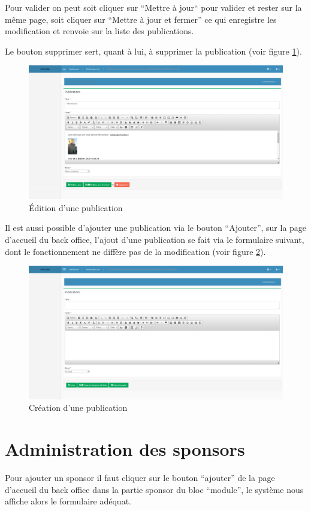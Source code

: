 \documentclass[a4paper,12pt, notitlepage]{report}
\begin{document}
Pour valider on peut soit cliquer sur “Mettre à  jour“ pour valider et rester sur la même page, soit cliquer sur  “Mettre à jour et fermer” ce qui enregistre les modification et renvoie sur la liste des publications. 

Le bouton supprimer sert, quant à lui, à supprimer la publication (voir figure \ref{modif-publication}).
\begin{figure} 
    \caption{Édition d'une publication}  
    \label{modif-publication}
    \centering
    \includegraphics[scale=0.3]{images/modif-publication.png}
\end{figure}
Il est aussi possible d’ajouter une publication via le bouton “Ajouter”, sur la page d’accueil du back office, l’ajout d’une publication se fait via le formulaire suivant, dont le fonctionnement ne diffère pas de la modification (voir figure \ref{ajout-publication}).
\begin{figure} 
    \caption{Création d'une publication}  
    \label{ajout-publication}
    \centering
    \includegraphics[scale=0.3]{images/ajout-publication.png}
\end{figure}

\chapter{Administration des sponsors}
Pour ajouter un sponsor il faut cliquer sur le bouton “ajouter” de la page d’accueil du back office dans la partie sponsor du bloc “module”, le système nous affiche alors le formulaire adéquat.
\end{document}
